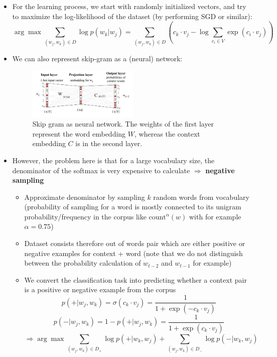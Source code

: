 \begin{itemize}
	\item For the learning process, we start with randomly initialized vectors, and try to maximize the log-likelihood of the dataset (by performing SGD or similar):
	$$\arg\max \sum\limits_{\left(w_j, w_k\right)\in D} \log p\left(w_k|w_j\right) = \sum\limits_{\left(w_j, w_k\right)\in D}  \left(c_k \cdot v_j - \log \sum\limits_{c_i \in V} \exp\left(c_i \cdot v_j\right)\right)$$
	\item We can also represent skip-gram as a (neural) network:
	\begin{figure}[ht]
		\centering
		\includegraphics[width=0.5\textwidth]{figures/skip_gram_nn.png}
		\caption{Skip gram as neural network. The weights of the first layer represent the word embedding $W$, whereas the context embedding $C$ is in the second layer.}
		\label{fig:skip_gram_nn}
	\end{figure}
	\item However, the problem here is that for a large vocabulary size, the denominator of the softmax is very expensive to calculate $\Rightarrow$ \textbf{negative sampling}
	\begin{itemize}
		\item Approximate denominator by sampling $k$ random words from vocabulary (probability of sampling for a word is mostly connected to its unigram probability/frequency in the corpus like $\text{count}^{\alpha}(w)$ with for example $\alpha=0.75$)
		\item Dataset consists therefore out of words pair which are either positive or negative examples for context + word (note that we do not distinguish between the probability calculation of $w_{t-2}$ and $w_{t-1}$ for example)
		\item We convert the classification task into predicting whether a context pair is a positive or negative example from the corpus
		$$p\left(+|w_j, w_k\right) = \sigma(c_k\cdot v_j) = \frac{1}{1 + \exp(-c_k\cdot v_j)}$$
		$$p\left(-|w_j, w_k\right) = 1 - p\left(+|w_j, w_k\right) = \frac{1}{1 + \exp(c_k\cdot v_j)}$$
		$$\Rightarrow \arg\max \sum\limits_{\left(w_j, w_k\right)\in D_{+}} \log p\left(+|w_k,w_j\right) + \sum\limits_{\left(w_j, w_k\right)\in D_{-}} \log p\left(-|w_k,w_j\right) $$

\end{itemize}
\end{itemize}
